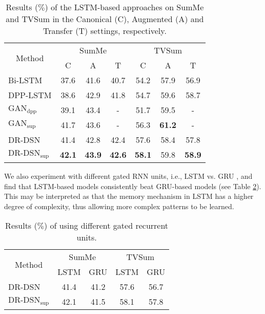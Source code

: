\documentclass[letterpaper]{article} \usepackage{aaai18}  \usepackage{times}  \usepackage{helvet}  \usepackage{courier}  \usepackage{url}  \usepackage{graphicx}
\begin{document}
\begin{table}[h]
\centering
\caption{Results ($\%$) of the LSTM-based approaches on SumMe and TVSum in the Canonical (C), Augmented (A) and Transfer (T) settings, respectively.}
\label{tb:resOfAugTran}
\begin{tabular}{l | c | c | c | c | c | c}
\hline
\multicolumn{1}{c|}{\multirow{2}{*}{Method}} & \multicolumn{3}{c|}{SumMe} & \multicolumn{3}{c}{TVSum} \\ \cline{2-7} 
\multicolumn{1}{c|}{} & C & A & T & C & A & T \\ 
\hline
Bi-LSTM & 37.6 & 41.6 & 40.7 & 54.2 & 57.9 & 56.9 \\
DPP-LSTM & 38.6 & 42.9 & 41.8 & 54.7 & 59.6 & 58.7 \\
$\text{GAN}_\text{dpp}$ & 39.1 & 43.4 & - & 51.7 & 59.5 & - \\
$\text{GAN}_\text{sup}$ & 41.7 & 43.6 & - & 56.3 & {\bf 61.2} & - \\
\hline \hline
DR-DSN & 41.4 & 42.8 & 42.4 & 57.6 & 58.4 & 57.8 \\
$\text{DR-DSN}_\text{sup}$ & {\bf 42.1} & {\bf 43.9} & {\bf 42.6} & {\bf 58.1} & 59.8 & {\bf 58.9} \\ 
\hline
\end{tabular}
\end{table}

We also experiment with different gated RNN units, i.e., LSTM vs. GRU \cite{cho2014properties}, and find that LSTM-based models consistently beat GRU-based models (see Table \ref{tb:lstmgru}). This may be interpreted as that the memory mechanism in LSTM has a higher degree of complexity, thus allowing more complex patterns to be learned.

\begin{table}[h]
\centering
\caption{Results ($\%$) of using different gated recurrent units.}
\label{tb:lstmgru}
\begin{tabular}{l | c | c | c | c}
\hline
\multicolumn{1}{c|}{\multirow{2}{*}{Method}} & \multicolumn{2}{c|}{SumMe} & \multicolumn{2}{c}{TVSum} \\ \cline{2-5} 
\multicolumn{1}{c|}{} & LSTM & GRU & LSTM & GRU \\ \hline
DR-DSN & 41.4 & 41.2 & 57.6 & 56.7 \\ \hline
$\text{DR-DSN}_\text{sup}$ & 42.1 & 41.5 & 58.1 & 57.8 \\ \hline
\end{tabular}
\end{table}
\end{document}
